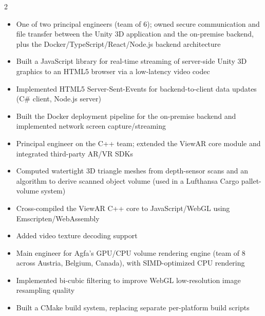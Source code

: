 \documentclass[10pt,a4paper,withhyper]{altacv}
\begin{document}
\begin{paracol}{2}
\divider

\begin{itemize}
\item One of two principal engineers (team of 6); owned secure communication and file transfer between the Unity 3D application and the on-premise backend, plus the Docker/TypeScript/React/Node.js backend architecture
\item Built a JavaScript library for real-time streaming of server-side Unity 3D graphics to an HTML5 browser via a low-latency video codec
\item Implemented HTML5 Server-Sent-Events for backend-to-client data updates (C\# client, Node.js server)
\item Built the Docker deployment pipeline for the on-premise backend and implemented network screen capture/streaming
\end{itemize}

\divider

\begin{itemize}
\item Principal engineer on the C++ team; extended the ViewAR core module and integrated third-party AR/VR SDKs
\item Computed watertight 3D triangle meshes from depth-sensor scans and an algorithm to derive scanned object volume (used in a Lufthansa Cargo pallet-volume system)
\item Cross-compiled the ViewAR C++ core to JavaScript/WebGL using Emscripten/WebAssembly
\item Added video texture decoding support
\end{itemize}

\divider

\begin{itemize}
\item Main engineer for Agfa's GPU/CPU volume rendering engine (team of 8 across Austria, Belgium, Canada), with SIMD-optimized CPU rendering
\item Implemented bi-cubic filtering to improve WebGL low-resolution image resampling quality
\item Built a CMake build system, replacing separate per-platform build scripts
\end{itemize}


\end{paracol}
\end{document}
